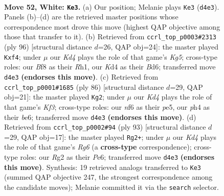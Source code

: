 \documentclass[11pt]{article}
\begin{document}
\clearpage

\begin{figure}[p]\centering
\begin{subfigure}{0.46\textwidth}\centering
\resizebox{\linewidth}{!}{%
\newchessgame
\chessboard[
  setfen={5B2/2r2p1k/5n2/8/p2Kp2p/P6P/5PR1/8 w - - 4 52},
  showmover=false,
  pgfstyle=straightmove, color=movearrow, markmove={d4-e3}
]}
\caption{}
\end{subfigure}\hfill
\begin{subfigure}{0.46\textwidth}\centering
\resizebox{\linewidth}{!}{%
\newchessgame
\chessboard[
  setfen={7k/7P/3B4/p5K1/n4p2/5P2/Pp2r3/7R w - - 3 49},
  showmover=false,
  pgfstyle=straightmove, color=movearrow, markmove={g5-f4}
]}
\caption{}
\end{subfigure}
\\[4pt]
\begin{subfigure}{0.46\textwidth}\centering
\resizebox{\linewidth}{!}{%
\newchessgame
\chessboard[
  setfen={8/1k5p/4bn2/4p3/Bp2Pp2/5K2/2R4P/8 w - - 4 44},
  showmover=false,
  pgfstyle=straightmove, color=movearrow, markmove={f3-g2}
]}
\caption{}
\end{subfigure}\hfill
\begin{subfigure}{0.46\textwidth}\centering
\resizebox{\linewidth}{!}{%
\newchessgame
\chessboard[
  setfen={8/R7/3kpp1p/1P1b4/P4P2/6rP/1N1K4/8 b - - 2 47},
  showmover=false,
  pgfstyle=straightmove, color=movearrow, markmove={g3-g2}
]}
\caption{}
\end{subfigure}
\caption{\textbf{Move 52, White: \texttt{Ke3}.} (a) Our position; Melanie plays \texttt{Ke3} (\texttt{d4e3}). Panels (b)--(d) are the retrieved master positions whose correspondence most drove this move (highest QAP objective among those that transfer to it). (b) Retrieved from \texttt{ccrl\_top\_p0003\#2313} (ply 96) [structural distance $d$=26, QAP obj=24]: the master played \texttt{Kxf4}; under $\mu$ our \emph{Kd4} plays the role of that game's \emph{Kg5}; cross-type roles: our \emph{B}f8 as their \emph{R}h1, our \emph{K}d4 as their \emph{B}d6; transferred move \texttt{d4e3} \textbf{(endorses this move)}. (c) Retrieved from \texttt{ccrl\_top\_p0001\#1685} (ply 86) [structural distance $d$=29, QAP obj=21]: the master played \texttt{Kg2}; under $\mu$ our \emph{Kd4} plays the role of that game's \emph{Kf3}; cross-type roles: our \emph{n}f6 as their \emph{p}e5, our \emph{p}h4 as their \emph{b}e6; transferred move \texttt{d4e3} \textbf{(endorses this move)}. (d) Retrieved from \texttt{ccrl\_top\_p0002\#94} (ply 93) [structural distance $d$=29, QAP obj=17]: the master played \texttt{Rg2+}; under $\mu$ our \emph{Kd4} plays the role of that game's \emph{Rg6} (a \textbf{cross-type} correspondence); cross-type roles: our \emph{R}g2 as their \emph{P}e6; transferred move \texttt{d4e3} \textbf{(endorses this move)}. Synthesis: 19 retrieved analogs transferred to \texttt{Ke3} (summed QAP objective 247, the strongest correspondence among the candidate moves); Melanie committed it via the \texttt{search} selector.}
\label{fig:thought-m102}
\end{figure}
\end{document}
